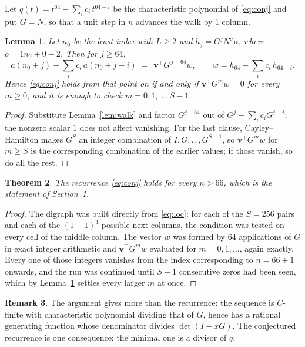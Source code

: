 \documentclass[11pt,a4paper]{article}
\theoremstyle{plain}
\newtheorem{theorem}{Theorem}
\newtheorem{lemma}[theorem]{Lemma}
\theoremstyle{definition}
\newtheorem{remark}[theorem]{Remark}
\begin{document}
Let $q(t)=t^{64}-\sum_i c_i\,t^{64-i}$ be the characteristic polynomial of
\eqref{eq:conj} and put $G=N$, so that a unit step in $n$ advances the walk by
$1$ column.

\begin{lemma}\label{lem:crit}
Let $n_0$ be the least index with $L\ge2$ and $h_j=G^{j}N^{o}\mathbf{u}$, where
$o=1n_0+0-2$. Then for $j\ge64$,
\[
a(n_0+j)-\sum_i c_i\,a(n_0+j-i)\;=\;\,\mathbf{v}^{\!\top}G^{\,j-64}w,
\qquad w=h_{64}-\sum_i c_i\,h_{64-i} .
\]
Hence \eqref{eq:conj} holds from that point on if and only if
$\mathbf{v}^{\!\top}G^{m}w=0$ for every $m\ge0$, and it is enough to check
$m=0,1,\dots,S-1$.
\end{lemma}

\begin{proof}
Substitute Lemma~\ref{lem:walk} and factor $G^{j-64}$ out of
$G^{j}-\sum_ic_iG^{j-i}$; the nonzero scalar $1$ does not affect
vanishing. For the last clause, Cayley--Hamilton makes $G^{S}$ an integer combination of
$I,G,\dots,G^{S-1}$, so $\mathbf{v}^{\!\top}G^{m}w$ for $m\ge S$ is the corresponding
combination of the earlier values; if those vanish, so do all the rest.
\end{proof}

\begin{theorem}
The recurrence \eqref{eq:conj} holds for every $n>66$, which is the statement of
Section~1.
\end{theorem}

\begin{proof}
The digraph was built directly from \eqref{eq:loc}: for each of the $S=256$ pairs and each
of the $(1+1)^{4}$ possible next columns, the condition was tested on every cell of
the middle column. The vector $w$ was formed by $64$ applications of $G$ in exact integer
arithmetic and $\mathbf{v}^{\!\top}G^{m}w$ evaluated for $m=0,1,\dots$, again exactly.
Every one of those integers vanishes from the index corresponding to $n=66+1$ onwards,
and the run was continued until $S+1$ consecutive zeros had been seen, which by
Lemma~\ref{lem:crit} settles every larger $m$ at once.
\end{proof}

\begin{remark}
The argument gives more than the recurrence: the sequence is $C$-finite with characteristic
polynomial dividing that of $G$, hence has a rational generating function whose denominator
divides $\det(I-xG)$. The conjectured recurrence is one consequence; the minimal one is a
divisor of $q$.
\end{remark}
\end{document}
